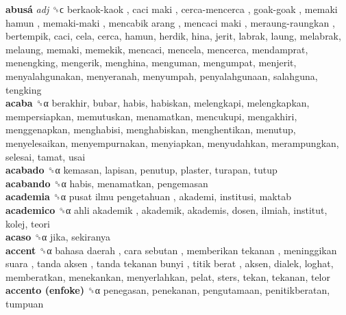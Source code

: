 \textbf{abusá} \emph{adj}  ␝ϲ   berkaok-kaok ,  caci maki ,  cerca-mencerca ,  goak-goak ,  memaki hamun ,  memaki-maki ,  mencabik arang ,  mencaci maki ,  meraung-raungkan , bertempik, caci, cela, cerca, hamun, herdik, hina, jerit, labrak, laung, melabrak, melaung, memaki, memekik, mencaci, mencela, mencerca, mendamprat, menengking, mengerik, menghina, menguman, mengumpat, menjerit, menyalahgunakan, menyeranah, menyumpah, penyalahgunaan, salahguna, tengking  \\
\textbf{acaba} ␝α  berakhir, bubar, habis, habiskan, melengkapi, melengkapkan, mempersiapkan, memutuskan, menamatkan, mencukupi, mengakhiri, menggenapkan, menghabisi, menghabiskan, menghentikan, menutup, menyelesaikan, menyempurnakan, menyiapkan, menyudahkan, merampungkan, selesai, tamat, usai  \\
\textbf{acabado} ␝α  kemasan, lapisan, penutup, plaster, turapan, tutup  \\
\textbf{acabando} ␝α  habis, menamatkan, pengemasan  \\
\textbf{academia} ␝α   pusat ilmu pengetahuan , akademi, institusi, maktab  \\
\textbf{academico} ␝α   ahli akademik , akademik, akademis, dosen, ilmiah, institut, kolej, teori  \\
\textbf{acaso} ␝α  jika, sekiranya  \\
\textbf{accent} ␝α   bahasa daerah ,  cara sebutan ,  memberikan tekanan ,  meninggikan suara ,  tanda aksen ,  tanda tekanan bunyi ,  titik berat , aksen, dialek, loghat, memberatkan, menekankan, menyerlahkan, pelat, sters, tekan, tekanan, telor  \\
\textbf{accento (enfoke)} ␝α  penegasan, penekanan, pengutamaan, penitikberatan, tumpuan  \\
